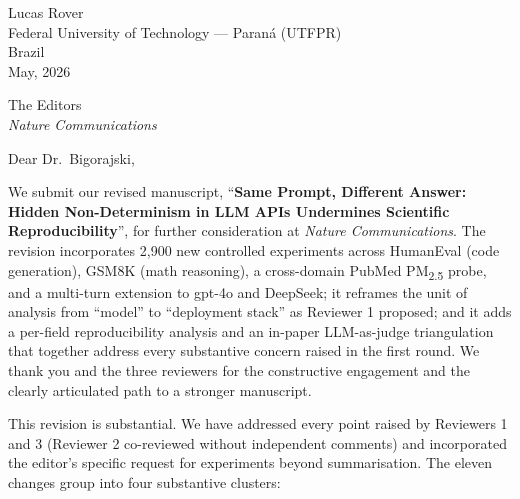\documentclass[11pt,a4paper]{article}
\begin{document}
\begin{flushright}
Lucas Rover\\
Federal University of Technology --- Paraná (UTFPR)\\
Brazil\\

\bigskip
May, 2026
\end{flushright}

\bigskip

\noindent The Editors\\
\emph{Nature Communications}\\

\bigskip

Dear Dr.\ Bigorajski,

We submit our revised manuscript, ``\textbf{Same Prompt, Different Answer: Hidden Non-Determinism in LLM APIs Undermines Scientific Reproducibility}'', for further consideration at \emph{Nature Communications}. The revision incorporates 2{,}900 new controlled experiments across HumanEval (code generation), GSM8K (math reasoning), a cross-domain PubMed PM\textsubscript{2.5} probe, and a multi-turn extension to gpt-4o and DeepSeek; it reframes the unit of analysis from ``model'' to ``deployment stack'' as Reviewer 1 proposed; and it adds a per-field reproducibility analysis and an in-paper LLM-as-judge triangulation that together address every substantive concern raised in the first round. We thank you and the three reviewers for the constructive engagement and the clearly articulated path to a stronger manuscript.

This revision is substantial. We have addressed every point raised by Reviewers 1 and 3 (Reviewer 2 co-reviewed without independent comments) and incorporated the editor's specific request for experiments beyond summarisation. The eleven changes group into four substantive clusters:
\end{document}
